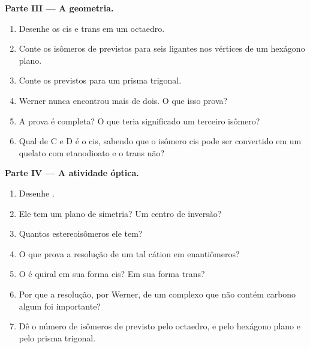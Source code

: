 \begin{problem}
\medskip
\noindent\textbf{Parte III --- A geometria.}
\begin{enumerate}[resume]
  \item Desenhe os \ce{[CoCl2(NH3)4]+} cis e trans em um octaedro.
  \item Conte os isômeros de \ce{[CoCl2(NH3)4]+} previstos para seis ligantes
        nos vértices de um hexágono plano.
  \item Conte os previstos para um prisma trigonal.
  \item Werner nunca encontrou mais de dois. O que isso prova?
  \item A prova é completa? O que teria significado um terceiro isômero?
  \item Qual de C e D é o cis, sabendo que o isômero cis pode ser convertido em
        um quelato com etanodioato e o trans não?
\end{enumerate}

\medskip
\noindent\textbf{Parte IV --- A atividade óptica.}
\begin{enumerate}[resume]
  \item Desenhe .
  \item Ele tem um plano de simetria? Um centro de inversão?
  \item Quantos estereoisômeros ele tem?
  \item O que prova a resolução de um tal cátion em enantiômeros?
  \item O \ce{[CoCl2(en)2]+} é quiral em sua forma cis? Em sua forma trans?
  \item Por que a resolução, por Werner, de um complexo que não contém carbono
        algum foi importante?
  \item Dê o número de isômeros de \ce{[CoCl2(NH3)4]+} previsto pelo octaedro, e
        pelo hexágono plano e pelo prisma trigonal.
\end{enumerate}
\end{problem}
